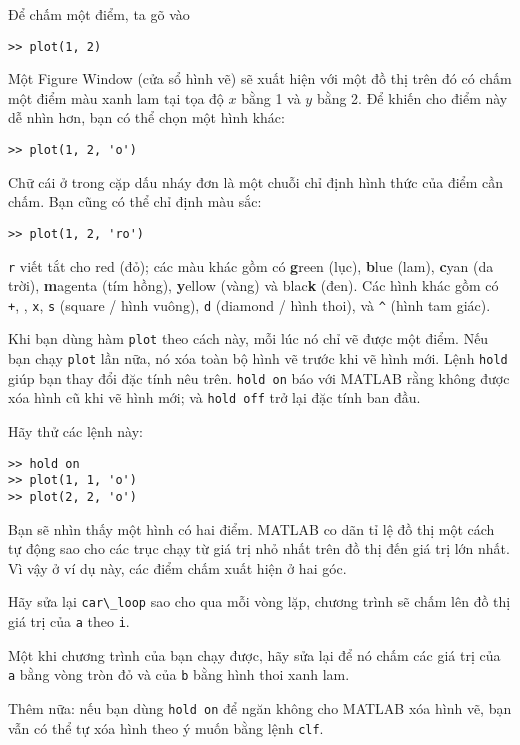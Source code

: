 \documentclass[12pt]{book}
\begin{document}
Để chấm một điểm, ta gõ vào

\begin{verbatim}
>> plot(1, 2)
\end{verbatim}

Một {\sf Figure Window} (cửa sổ hình vẽ) sẽ xuất hiện với một đồ thị
trên đó có chấm một điểm màu xanh lam tại tọa độ $x$ bằng 1 và 
$y$ bằng 2. Để khiến cho điểm này dễ nhìn hơn, bạn có thể chọn một
hình khác:

\begin{verbatim}
>> plot(1, 2, 'o')
\end{verbatim}
%
Chữ cái ở trong cặp dấu nháy đơn là một chuỗi chỉ định hình thức
của điểm cần chấm. Bạn cũng có thể chỉ định màu sắc:

\begin{verbatim}
>> plot(1, 2, 'ro')
\end{verbatim}
%
{\tt r} viết tắt cho red (đỏ); các màu khác gồm có {\bf g}reen (lục),
{\bf b}lue (lam), {\bf c}yan (da trời), {\bf m}agenta (tím hồng), 
{\bf y}ellow (vàng) và blac{\bf k} (đen).
Các hình khác gồm có {\tt +}, 
{\tt *}, 
{\tt x}, 
{\tt s} (square / hình vuông), 
{\tt d} (diamond / hình thoi), và 
\verb+^+ (hình tam giác). 

Khi bạn dùng hàm {\tt plot} theo cách này, mỗi lúc nó chỉ vẽ được một điểm.
Nếu bạn chạy {\tt plot} lần nữa, nó xóa toàn bộ hình vẽ trước khi vẽ hình mới. 
Lệnh {\tt hold} giúp bạn thay đổi đặc tính nêu trên. {\tt hold on} báo với 
MATLAB rằng không được xóa hình cũ khi vẽ hình mới; và {\tt hold off}
trở lại đặc tính ban đầu.

Hãy thử các lệnh này:

\begin{verbatim}
>> hold on
>> plot(1, 1, 'o')
>> plot(2, 2, 'o')
\end{verbatim}
%
Bạn sẽ nhìn thấy một hình có hai điểm. MATLAB co dãn tỉ lệ đồ thị
một cách tự động sao cho các trục chạy từ giá trị nhỏ nhất trên đồ thị
đến giá trị lớn nhất. Vì vậy ở ví dụ này, các điểm chấm xuất hiện ở
hai góc.

\begin{ex}
Hãy sửa lại \verb#car\_loop# sao cho qua mỗi vòng lặp, chương trình
sẽ chấm lên đồ thị giá trị của {\tt a} theo {\tt i}.

Một khi chương trình của bạn chạy được, hãy sửa lại để nó chấm
các giá trị của {\tt a} bằng vòng tròn đỏ và của {\tt b} bằng 
hình thoi xanh lam.

Thêm nữa: nếu bạn dùng {\tt hold on} để ngăn không cho MATLAB 
xóa hình vẽ, bạn vẫn có thể tự xóa hình theo ý muốn bằng lệnh
{\tt clf}.
\end{ex}
\end{document}
